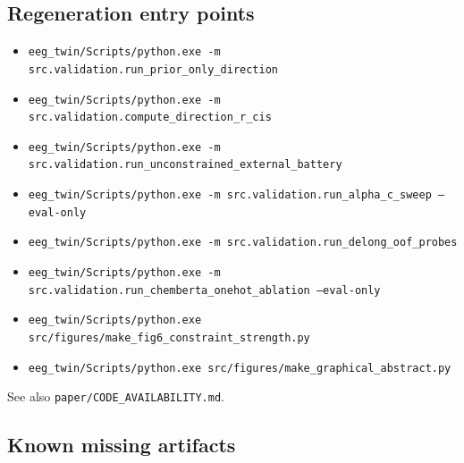 \subsection{Regeneration entry points}

\begin{itemize}
  \item \texttt{eeg\_\allowbreak{}twin/\allowbreak{}Scripts/\allowbreak{}python.\allowbreak{}exe -m src.\allowbreak{}validation.\allowbreak{}run\_\allowbreak{}prior\_\allowbreak{}only\_\allowbreak{}direction}
  \item \texttt{eeg\_\allowbreak{}twin/\allowbreak{}Scripts/\allowbreak{}python.\allowbreak{}exe -m src.\allowbreak{}validation.\allowbreak{}compute\_\allowbreak{}direction\_\allowbreak{}r\_\allowbreak{}cis}
  \item \texttt{eeg\_\allowbreak{}twin/\allowbreak{}Scripts/\allowbreak{}python.\allowbreak{}exe -m src.\allowbreak{}validation.\allowbreak{}run\_\allowbreak{}unconstrained\_\allowbreak{}external\_\allowbreak{}battery}
  \item \texttt{eeg\_\allowbreak{}twin/\allowbreak{}Scripts/\allowbreak{}python.\allowbreak{}exe -m src.\allowbreak{}validation.\allowbreak{}run\_\allowbreak{}alpha\_\allowbreak{}c\_\allowbreak{}sweep --eval-only}
  \item \texttt{eeg\_\allowbreak{}twin/\allowbreak{}Scripts/\allowbreak{}python.\allowbreak{}exe -m src.\allowbreak{}validation.\allowbreak{}run\_\allowbreak{}delong\_\allowbreak{}oof\_\allowbreak{}probes}
  \item \texttt{eeg\_\allowbreak{}twin/\allowbreak{}Scripts/\allowbreak{}python.\allowbreak{}exe -m src.\allowbreak{}validation.\allowbreak{}run\_\allowbreak{}chemberta\_\allowbreak{}onehot\_\allowbreak{}ablation --eval-only}
  \item \texttt{eeg\_\allowbreak{}twin/\allowbreak{}Scripts/\allowbreak{}python.\allowbreak{}exe src/\allowbreak{}figures/\allowbreak{}make\_\allowbreak{}fig6\_\allowbreak{}constraint\_\allowbreak{}strength.\allowbreak{}py}
  \item \texttt{eeg\_\allowbreak{}twin/\allowbreak{}Scripts/\allowbreak{}python.\allowbreak{}exe src/\allowbreak{}figures/\allowbreak{}make\_\allowbreak{}graphical\_\allowbreak{}abstract.\allowbreak{}py}
\end{itemize}

See also \texttt{paper/\allowbreak{}CODE\_\allowbreak{}AVAILABILITY.\allowbreak{}md}.


\subsection{Known missing artifacts}

